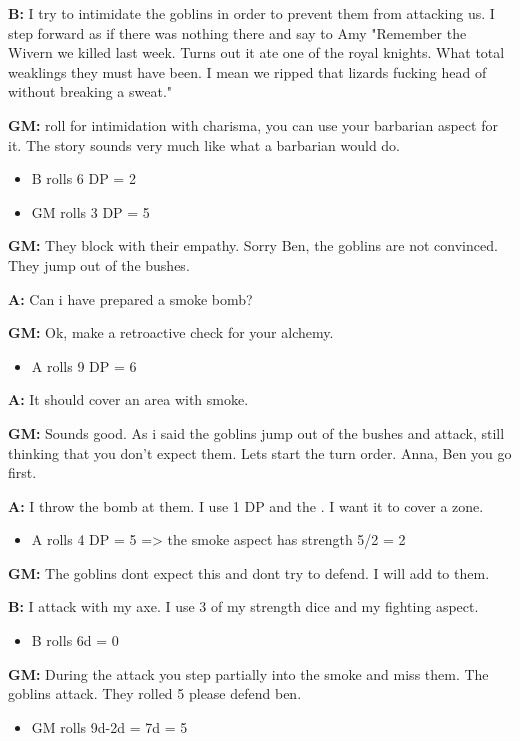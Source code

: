 \documentclass[11pt]{article}
\begin{document}
{\textbf{B:} I try to intimidate the goblins in order to prevent them from attacking us. I step forward as if there was nothing there and say to Amy "Remember the Wivern we killed last week. Turns out it ate one of the royal knights. What total weaklings they must have been. I mean we ripped that lizards fucking head of without breaking a sweat."

\textbf{GM:} roll for intimidation with charisma, you can use your barbarian aspect for it. The story sounds very much like what a barbarian would do.
\begin{itemize}
\item B rolls 6 DP = 2
\item GM rolls 3 DP = 5
\end{itemize}

\textbf{GM:} They block with their empathy. Sorry Ben, the goblins are not convinced. They jump out of the bushes.

\textbf{A:} Can i have prepared a smoke bomb?

\textbf{GM:} Ok, make a retroactive check for your alchemy.
\begin{itemize}
\item A rolls 9 DP = 6
\end{itemize}

\textbf{A:} It should cover an area with smoke. 

\textbf{GM:} Sounds good. As i said the goblins jump out of the bushes and attack, still thinking that you don't expect them. Lets start the turn order. Anna, Ben you go first. 

\textbf{A:} I throw the bomb at them. I use 1 DP and the . I want it to cover a zone.
\begin{itemize}
\item A rolls 4 DP = 5 => the smoke aspect has strength 5/2 = 2
\end{itemize}

\textbf{GM:} The goblins dont expect this and dont try to defend. I will add  to them.

\textbf{B:} I attack with my axe. I use 3 of my strength dice and my fighting aspect.
\begin{itemize}
\item B rolls 6d = 0
\end{itemize}

\textbf{GM:} During the attack you step partially into the smoke and miss them. The goblins attack. They rolled 5 please defend ben.
\begin{itemize}
\item GM rolls 9d-2d = 7d = 5
\end{itemize}

}
\end{document}
